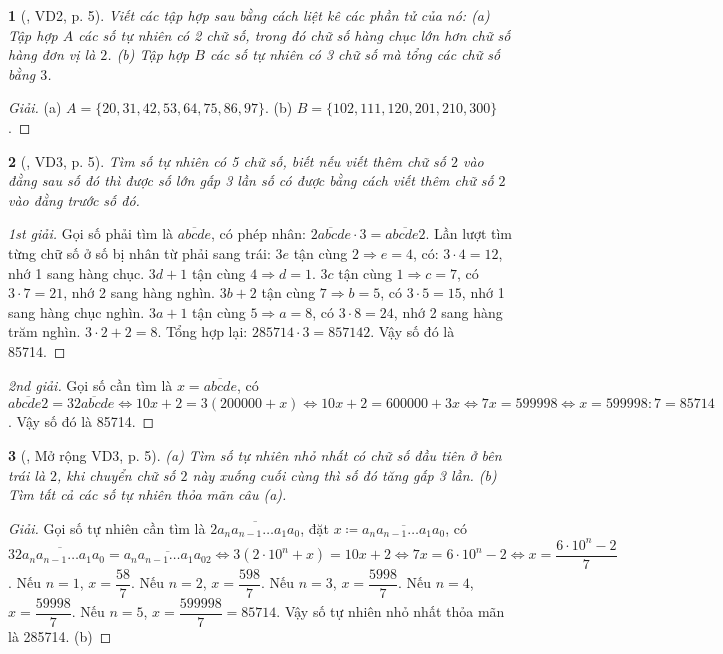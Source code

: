\documentclass{article}
\newtheorem{baitoan}{}
\begin{document}
\begin{baitoan}[\cite{Binh_Toan_6_tap_1}, VD2, p. 5]
	Viết các tập hợp sau bằng cách liệt kê các phần tử của nó: (a) Tập hợp $A$ các số tự nhiên có 2 chữ số, trong đó chữ số hàng chục lớn hơn chữ số hàng đơn vị là $2$. (b) Tập hợp $B$ các số tự nhiên có 3 chữ số mà tổng các chữ số bằng $3$.
\end{baitoan}

\begin{proof}[Giải]
	(a) $A = \{20,31,42,53,64,75,86,97\}$. (b) $B = \{102,111,120,201,210,300\}$.
\end{proof}

\begin{baitoan}[\cite{Binh_Toan_6_tap_1}, VD3, p. 5]
	Tìm số tự nhiên có 5 chữ số, biết nếu viết thêm chữ số $2$ vào đằng sau số đó thì được số lớn gấp 3 lần số có được bằng cách viết thêm chữ số $2$ vào đằng trước số đó.
\end{baitoan}

\begin{proof}[1st giải]
	Gọi số phải tìm là $\overline{abcde}$, có phép nhân: $\overline{2abcde}\cdot3 = \overline{abcde2}$. Lần lượt tìm từng chữ số ở số bị nhân từ phải sang trái: $3e$ tận cùng $2\Rightarrow e = 4$, có: $3\cdot4 = 12$, nhớ 1 sang hàng chục. $3d + 1$ tận cùng $4\Rightarrow d = 1$. $3c$ tận cùng $1\Rightarrow c = 7$, có $3\cdot7 = 21$, nhớ 2 sang hàng nghìn. $3b + 2$ tận cùng $7\Rightarrow b = 5$, có $3\cdot5 = 15$, nhớ 1 sang hàng chục nghìn. $3a + 1$ tận cùng $5\Rightarrow a = 8$, có $3\cdot8 = 24$, nhớ 2 sang hàng trăm nghìn. $3\cdot2 + 2 = 8$. Tổng hợp lại: $285714\cdot3 = 857142$. Vậy số đó là 85714.
\end{proof}

\begin{proof}[2nd giải]
	Gọi số cần tìm là $x = \overline{abcde}$, có $\overline{abcde2} = 3\overline{2abcde}\Leftrightarrow10x + 2 = 3(200000 + x)\Leftrightarrow10x + 2 = 600000 + 3x\Leftrightarrow7x = 599998\Leftrightarrow x = 599998:7 = 85714$. Vậy số đó là 85714.
\end{proof}

\begin{baitoan}[\cite{Binh_Toan_6_tap_1}, Mở rộng VD3, p. 5]
	(a) Tìm số tự nhiên nhỏ nhất có chữ số đầu tiên ở bên trái là $2$, khi chuyển chữ số $2$ này xuống cuối cùng thì số đó tăng gấp 3 lần. (b) Tìm tất cả các số tự nhiên thỏa mãn câu (a).
\end{baitoan}

\begin{proof}[Giải]
	Gọi số tự nhiên cần tìm là $\overline{2a_na_{n-1}\ldots a_1a_0}$, đặt $x\coloneqq\overline{a_na_{n-1}\ldots a_1a_0}$, có $3\overline{2a_na_{n-1}\ldots a_1a_0} = \overline{a_na_{n-1}\ldots a_1a_02}\Leftrightarrow3(2\cdot10^n + x) = 10x + 2\Leftrightarrow7x = 6\cdot10^n - 2\Leftrightarrow x = \dfrac{6\cdot10^n - 2}{7}$. Nếu $n = 1$, $x = \dfrac{58}{7}$. Nếu $n = 2$, $x = \dfrac{598}{7}$. Nếu $n = 3$, $x = \dfrac{5998}{7}$. Nếu $n = 4$, $x = \dfrac{59998}{7}$. Nếu $n = 5$, $x = \dfrac{599998}{7} = 85714$. Vậy số tự nhiên nhỏ nhất thỏa mãn là 285714. (b) 
\end{proof}
\end{document}
